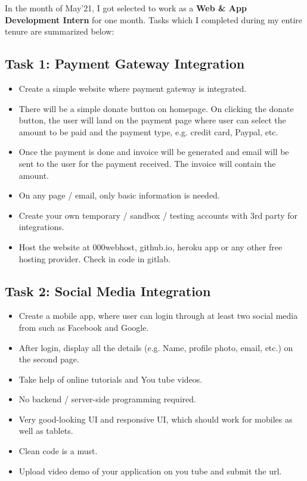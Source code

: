 \documentclass[12pt]{article}
\begin{document}
In the month of May’21, I got selected to work as a \textbf{Web \& App\\ Development Intern} for one month. Tasks which I completed during my entire tenure are summarized below:

\subsection{Task 1: Payment Gateway Integration}
\begin{itemize}
\item Create a simple website where payment gateway is integrated.
\item There will be a simple donate button on homepage. On clicking the donate button, the user will land on the payment page where user can select the amount to be paid and the payment type, e.g. credit card, Paypal, etc.
\item Once the payment is done and invoice will be generated and email will be sent to the user for the payment received. The invoice will contain the amount.
\item On any page / email, only basic information is needed.
\item Create your own temporary / sandbox / testing accounts with 3rd party for integrations.
\item Host the website at 000webhost, github.io, heroku app or any other free hosting provider. Check in code in gitlab.

\end{itemize}


\subsection{Task 2: Social Media Integration}
\begin{itemize}
\item Create a mobile app, where user can login through at least two social media from such as Facebook and Google.
\item After login, display all the details (e.g. Name, profile photo, email, etc.) on the second page.
\item Take help of online tutorials and You tube videos.
\item No backend / server-side programming required.
\item Very good-looking UI and responsive UI, which should work for mobiles as well as tablets.
\item Clean code is a must.
\item Upload video demo of your application on you tube and submit the url.
\end{itemize}
\end{document}
